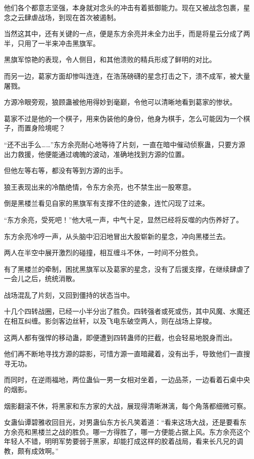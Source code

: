 \begin{this_body}
他们各个都意志坚强，本身就对念头的冲击有着抵御能力。现在又被战念包裹，星念之云肆虐战场，到现在首次被遏制。

当然这其中，还有关键的一点，便是东方余亮并未全力出手，而是将星云分成了两半，只用了一半来冲击黑旗军。

黑旗军惊艳的表现，令人侧目，和其他溃败的精兵形成了鲜明的对比。

而另一边，葛家方面却惨叫连连，在浩荡磅礴的星念打击之下，溃不成军，被大量屠戮。

方源冷眼旁观，狼顾蛊被他用得妙到毫巅，令他可以清晰地看到葛家的惨状。

葛家不过是他的一个棋子，用来伪装他的身份，他身为棋手，怎么可能因为一个棋子，而置身险境呢？

“还不出手么……”东方余亮耐心地等待了片刻，一直在暗中催动侦察蛊，只要方源出力救援，他便能通过魂魄的波动，准确地找到方源的位置。

但他左等右等，都没有等到方源的出手。

狼王表现出来的冷酷绝情，令东方余亮，也不禁生出一股寒意。

倒是黑楼兰看见自家的黑旗军有支撑不住的迹象，连忙闪现了过来。

“东方余亮，受死吧！”他大吼一声，中气十足，显然已经将反噬的内伤养好了。

东方余亮冷哼一声，从头脑中汩汩地冒出大股崭新的星念，冲向黑楼兰去。

两人在半空中展开激烈的碰撞，相互缠斗不休，一时间不分胜负。

有了黑楼兰的牵制，困扰黑旗军以及葛家的星念，没有了后援支撑，在继续肆虐了一会儿之后，统统消散。

战场混乱了片刻，又回到僵持的状态当中。

十几个四转战圈，已经一小半分出了胜负。四转强者或死或伤，其中风魔、水魔还在相互纠缠。影剑客边丝轩，以及飞电东破空两人，则在战场上穿梭。

这两人都有强悍的移动蛊，即便遭到四转蛊师的拦截，也会轻易地脱身而出。

他们再不断地寻找方源的踪影，可惜方源一直暗藏着，没有出手，导致他们一直搜寻无功。

而同时，在逆雨福地，两位蛊仙一男一女相对坐着，一边品茶，一边看着石桌中央的烟影。

烟影翻滚不休，将黑家和东方家的大战，展现得清晰淋漓，每个角落都细微可察。

女蛊仙谭碧雅收回目光，对男蛊仙东方长凡笑着道：“看来这场大战，还是要看东方余亮和黑楼兰之战的胜负。哪一方得胜了，哪一方便能占据上风。东方余亮这个年轻人不错，明明军势要弱于黑家，却能打成这样的胶着战局，看来长凡兄的调教，颇有成效啊。”


\end{this_body}
